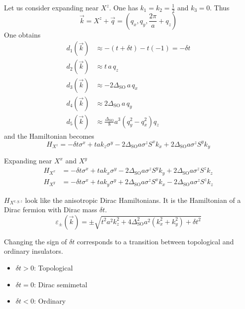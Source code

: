 \documentclass[12pt,a4paper,titlepage]{article}
\newcommand{\trm}[1]{\textrm{#1}} %
\begin{document}
Let us consider expanding near $X^{z}$. One has $k_{1}=k_{2}=\frac{1}{2}$ and $k_{3}=0$. Thus
\begin{equation}
\vec{k}=X^{z}+\vec{q}=\left(q_{x},q_{y},\frac{2\pi}{a}+q_{z}\right)
\end{equation}
One obtains
\begin{equation}
\begin{aligned}
d_{1}(\vec{k})&\approx -(t+\delta t)-t(-1)=-\delta t\\
d_{2}(\vec{k})&\approx t\,a\,q_{z}\\
d_{3}(\vec{k})&\approx -2\Delta_{\trm{SO}}\,a\,q_{x}\\
d_{4}(\vec{k})&\approx 2\Delta_{\trm{SO}}\,a\,q_{y}\\
d_{5}(\vec{k})&\approx \frac{\Delta_{\trm{SO}}}{8}a^{3}(q_{y}^{2}-q_{x}^{2})q_{z}
\end{aligned}
\end{equation}
and the Hamiltonian becomes
\begin{equation}
H_{X^{z}}=-\delta t \sigma^{x}+tak_{z}\sigma^{y}-2\Delta_{\trm{SO}}a\sigma^{z}S^{x}k_{x}+2\Delta_{\trm{SO}}a\sigma^{z}S^{y}k_{y}
\end{equation}

Expanding near $X^{x}$ and $X^{y}$
\begin{equation}
\begin{aligned}
H_{X^{x}}&=-\delta t\sigma^{x}+tak_{x}\sigma^{y}-2\Delta_{\trm{SO}}a\sigma^{z}S^{y}k_{y}+2\Delta_{\trm{SO}}a\sigma^{z}S^{z}k_{z}\\
H_{X^{y}}&=-\delta t\sigma^{x}+tak_{y}\sigma^{y}+2\Delta_{\trm{SO}}a\sigma^{z}S^{x}k_{x}-2\Delta_{\trm{SO}}a\sigma^{z}S^{z}k_{z}
\end{aligned}
\end{equation}

$H_{X^{x,y,z}}$ look like the anisotropic Dirac Hamiltonians. It is the Hamiltonian of a Dirac fermion with Dirac mass $\delta t$.
\begin{equation}
\varepsilon_{\pm}(\vec{k})=\pm\sqrt{t^{2}a^{2}k_{z}^{2}+4\Delta_{\trm{SO}}^{2}a^{2}(k_{x}^{2}+k_{y}^{2})+\delta t^{2}}
\end{equation}

Changing the sign of $\delta t$ corresponds to a transition between topological and ordinary insulators.
\begin{itemize}
\item $\delta t>0$: Topological
\item $\delta t=0$: Dirac semimetal
\item $\delta t<0$: Ordinary
\end{itemize}
\end{document}
